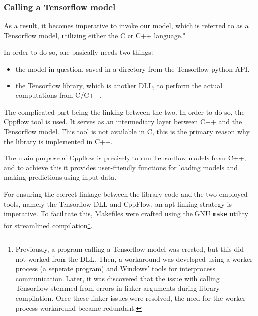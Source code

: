 

\subsubsection{Calling a Tensorflow model}

As a result, it becomes imperative to invoke our model, which is referred to as a Tensorflow model, utilizing either the C or C++ language."

In order to do so, one basically needs two things:
\begin{itemize}
    \item the model in question, saved in a directory from the Tensorflow python API.
    \item the Tensorflow library, which is another DLL, to perform the actual computations from C/C++.
\end{itemize}

The complicated part being the linking between the two. In order to do so, the \href{https://serizba.github.io/cppflow/}{Cppflow} tool is used. It serves as an intermediary layer between C++ and the Tensorflow model. This tool is not available in C, this is the primary reason why the library is implemented in C++.

The main purpose of Cppflow is precisely to run Tensorflow models from C++, and to achieve this it provides user-friendly functions for loading models and making predictions using input data.

For ensuring the correct linkage between the library code and the two employed tools, namely the Tensorflow DLL and CppFlow, an apt linking strategy is imperative. To facilitate this, Makefiles were crafted using the GNU \texttt{make} utility for streamlined compilation\footnote{Previously, a program calling a Tensorflow model was created, but this did not worked from the DLL. Then, a workaround was developed using a worker process (a seperate program) and Windows' tools for interprocess communication. Later, it was discovered that the issue with calling Tensorflow stemmed from errors in linker arguments during library compilation. Once these linker issues were resolved, the need for the worker process workaround became redundant.}.

